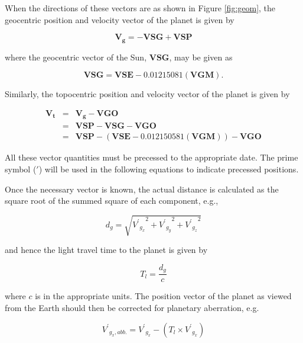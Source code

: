 \documentclass[11pt,twoside]{starlink}
\begin{document}
When the directions of these vectors are as shown in Figure \ref{fig:geom}, the geocentric position and velocity vector of the planet is given by

\begin{displaymath}
\boldsymbol{V_{g}} = - \boldsymbol{VSG} + \boldsymbol{VSP}
\end{displaymath}

where the geocentric vector of the Sun, $\boldsymbol{VSG}$, may be given as

\begin{displaymath}
\boldsymbol{VSG} = \boldsymbol{VSE} - 0.01215081 (\boldsymbol{VGM}).
\end{displaymath}

Similarly, the topocentric position and velocity vector of the planet is given by

\begin{eqnarray*}
\boldsymbol{V_t} & = & \boldsymbol{V_g} - \boldsymbol{VGO}\\
& = & \boldsymbol{VSP} - \boldsymbol{VSG} - \boldsymbol{VGO}\\
& = & \boldsymbol{VSP} - (\boldsymbol{VSE} - 0.012150581 (\boldsymbol{VGM})) - \boldsymbol{VGO}
\end{eqnarray*}

All these vector quantities must be precessed to the appropriate date. The prime symbol ($\prime$) will be used in the following equations to indicate precessed positions.

Once the necessary vector is known, the actual distance is calculated as the square root of the summed square of each component, e.g.,

\begin{displaymath}
d_g = \sqrt{{{{V^\prime}_{g_x}}^2} + {{{V^\prime}_{g_y}}^2} + {{{V^\prime}_{g_z}}^2}}
\end{displaymath}

and hence the light travel time to the planet is given by

\begin{displaymath}
T_l = \frac{d_g}{c}
\end{displaymath}

where $c$ is in the appropriate units.  The position vector of the planet as viewed from the Earth should then be corrected for planetary aberration, e.g.

\begin{displaymath}
{V^\prime}_{g_x, abb.} = {V^\prime}_{g_x} - (T_l \times {V^\prime}_{g_{\dot{x}}})
\end{displaymath}
\end{document}

